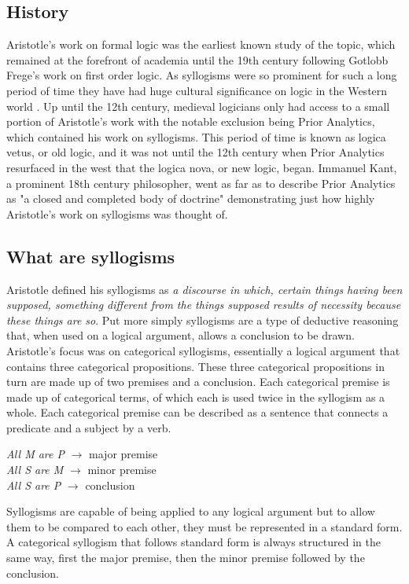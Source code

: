 \documentclass[12pt,a4paper]{report}
\newenvironment{tightcenter}{%
  \setlength\topsep{0pt}
  \setlength\parskip{0pt}
  \begin{center}
}{%
  \end{center}
}
\begin{document}
\subsection{History}

Aristotle's work on formal logic was the earliest known study of the topic, which remained at the forefront of academia until the 19th century following Gotlobb Frege's work on first order logic. As syllogisms were so prominent for such a long period of time they have had huge cultural significance on logic in the Western world \citep{sep-aristotle-logic}. Up until the 12th century, medieval logicians only had access to a small portion of Aristotle's work with the notable exclusion being Prior Analytics, which contained his work on syllogisms. This period of time is known as logica vetus, or old logic, and it was not until the 12th century when Prior Analytics resurfaced in the west that the logica nova, or new logic, began. Immanuel Kant, a prominent 18th century philosopher, went as far as to describe Prior Analytics as "a closed and completed body of doctrine" demonstrating just how highly Aristotle's work on syllogisms was thought of.

\subsection{What are syllogisms}
Aristotle defined his syllogisms as \textit{a discourse in which, certain things having been supposed, something different from the things supposed results of necessity because these things are so}. Put more simply syllogisms are a type of deductive reasoning that, when used on a logical argument, allows a conclusion to be drawn. Aristotle's focus was on categorical syllogisms, essentially a  logical argument that contains three categorical propositions. These three categorical propositions in turn are made up of two premises and a conclusion. Each categorical premise is made up of categorical terms, of which each is used twice in the syllogism as a whole. Each categorical premise can be described as a sentence that connects a predicate and a subject by a verb. 
\bigbreak
\begin{tightcenter}
\textit{All M are P} $\rightarrow$ major premise\\
\textit{All S are M} $\rightarrow$ minor premise\\
\textit{All S are P} $\rightarrow$ conclusion \\
\end{tightcenter}
\bigbreak
Syllogisms are capable of being applied to any logical argument but to allow them to be compared to each other, they must be represented in a standard form. A categorical syllogism that follows standard form is always structured in the same way, first the major premise, then the minor premise followed by the conclusion. 
\end{document}

